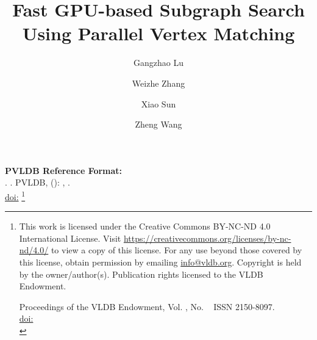 \documentclass[sigconf, nonacm]{acmart}
\begin{document}
\title{Fast GPU-based Subgraph Search Using Parallel Vertex Matching}

\author{Gangzhao Lu}

\author{Weizhe Zhang}

\author{Xiao Sun}

\author{Zheng Wang}


\maketitle
\pagestyle{\vldbpagestyle}
\begingroup\small\noindent\raggedright\textbf{PVLDB Reference Format:}\\
\vldbauthors. \vldbtitle. PVLDB, \vldbvolume(\vldbissue): \vldbpages, \vldbyear.\\
\href{https://doi.org/\vldbdoi}{doi:\vldbdoi}
\endgroup
\begingroup
\renewcommand\thefootnote{}\footnote{\noindent
This work is licensed under the Creative Commons BY-NC-ND 4.0 International License. Visit \url{https://creativecommons.org/licenses/by-nc-nd/4.0/} to view a copy of this license. For any use beyond those covered by this license, obtain permission by emailing \href{mailto:info@vldb.org}{info@vldb.org}. Copyright is held by the owner/author(s). Publication rights licensed to the VLDB Endowment. \\
\raggedright Proceedings of the VLDB Endowment, Vol. \vldbvolume, No. \vldbissue\ %
ISSN 2150-8097. \\
\href{https://doi.org/\vldbdoi}{doi:\vldbdoi} \\
}\addtocounter{footnote}{-1}\endgroup















\end{document}
